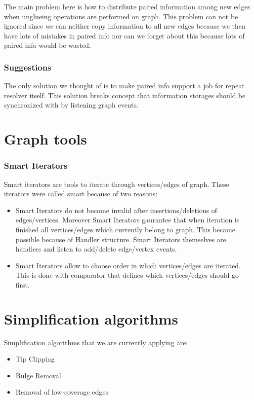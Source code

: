 \documentclass[12pt]{article}
\begin{document}
The main problem here is how to distribute paired information among new edges when unglueing operations are performed on graph. This problem can not be ignored since we can neither copy information to all new edges because we then have lots of mistakes in paired info nor can we forget about this because lots of paired info would be wasted.

\subsubsection{Suggestions}

The only solution we thought of is to make paired info support a job for repeat resolver itself. This solution breaks concept that information storages should be synchronized with by listening graph events.

\section{Graph tools}
\subsubsection{Smart Iterators}

Smart iterators are tools to iterate through vertices/edges of graph. These iterators were called smart because of two reasons:
\begin{itemize}
\item Smart Iterators do not become invalid after insertions/deletions of edges/vertices. Moreover Smart Iterators gaurantee that when iteration is finished all vertices/edges which currently belong to graph. This became possible because of Handler structure. Smart Iterators themselves are handlers and listen to add/delete edge/vertex events.
\item Smart Iterators allow to choose order in which vertices/edges are iterated. This is done with comparator that defines which vertices/edges should go first.
\end{itemize}

\section{Simplification algorithms}
Simplification algorithms that we are currently applying are:
\begin{itemize}
\item Tip Clipping
\item Bulge Removal
\item Removal of low-coverage edges
\end{itemize}
\end{document}
